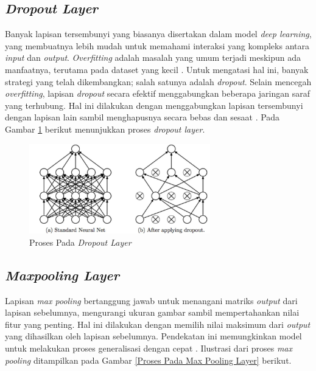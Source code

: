 \subsection{\textit{Dropout Layer}}

    Banyak lapisan tersembunyi yang biasanya disertakan dalam model \textit{deep learning}, yang membuatnya lebih mudah untuk memahami interaksi yang kompleks antara \textit{input} dan \textit{output}. \textit{Overfitting} adalah masalah yang umum terjadi meskipun ada manfaatnya, terutama pada dataset yang kecil \cite{Srivastava2014}. Untuk mengatasi hal ini, banyak strategi yang telah dikembangkan; salah satunya adalah \textit{dropout}. Selain mencegah \textit{overfitting}, lapisan \textit{dropout} secara efektif menggabungkan beberapa jaringan saraf yang terhubung. Hal ini dilakukan dengan menggabungkan lapisan tersembunyi dengan lapisan lain sambil menghapusnya secara bebas dan sesaat \cite{Srivastava2014}. Pada Gambar \ref{Proses Pada Dropout Layer} berikut menunjukkan proses \textit{dropout layer}.

    \begin{figure}[H]
      \centering
      \includegraphics[width=0.70\textwidth]{figures/bab2/drop out.jpg}
      \caption{Proses Pada \textit{Dropout Layer} \cite{ida}}
      \label{Proses Pada Dropout Layer}
    
    \end{figure} 
    

\subsection{\textit{Maxpooling Layer}}

    Lapisan \textit{max pooling} bertanggung jawab untuk menangani matriks \textit{output} dari lapisan sebelumnya, mengurangi ukuran gambar sambil mempertahankan nilai fitur yang penting. Hal ini dilakukan dengan memilih nilai maksimum dari \textit{output} yang dihasilkan oleh lapisan sebelumnya. Pendekatan ini memungkinkan model untuk melakukan proses generalisasi dengan cepat \cite{Gholamalinezhad2020, Nagi2011MaxpoolingCN}. Ilustrasi dari proses \textit{max pooling} ditampilkan pada Gambar \ref{Proses Pada Max Pooling Layer} berikut.


